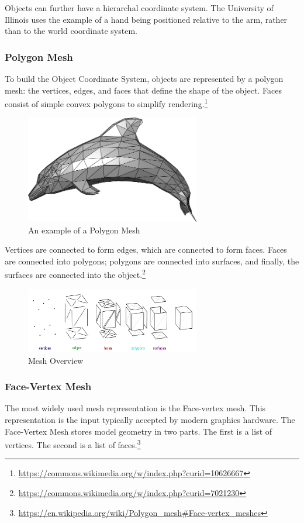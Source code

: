 \documentclass{article}
\begin{document}
Objects can further have a hierarchal coordinate system. The University of Illinois uses the example of a hand being positioned relative to the arm, rather than to the world coordinate system. 

\subsubsection{Polygon Mesh}
To build the Object Coordinate System, objects are represented by a polygon mesh: the vertices, edges, and faces that define the shape of the object. Faces consist of simple convex polygons to simplify rendering.\footnote{\url{https://commons.wikimedia.org/w/index.php?curid=10626667}}

\begin{figure}[H]
    \centering
    \includegraphics[width=3.0in]{Dolphin_triangle_mesh.png}
    \caption{An example of a Polygon Mesh}
    \label{dolphin}
\end{figure}

Vertices are connected to form edges, which are connected to form faces. Faces are connected into polygons; polygons are connected into surfaces, and finally, the surfaces are connected into the object.\footnote{\url{https://commons.wikimedia.org/w/index.php?curid=7021230}}

\begin{figure}[H]
    \centering
    \includegraphics[width=3.0in]{Mesh_overview.png}
    \caption{Mesh Overview}
    \label{meshOverview}
\end{figure}

\subsubsection{Face-Vertex Mesh}
The most widely used mesh representation is the Face-vertex mesh. This representation is the input typically accepted by modern graphics hardware. The Face-Vertex Mesh stores model geometry in two parts. The first is a list of vertices. The second is a list of faces.\footnote{\url{https://en.wikipedia.org/wiki/Polygon_mesh\#Face-vertex_meshes}}
\end{document}
